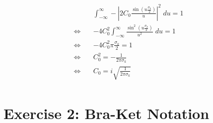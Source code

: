 \documentclass[a4paper,german,12pt,smallheadings]{scrartcl}
\begin{document}
\begin{enumerate}[a)]
    \begin{align*}
      &\int_{-\infty}^{\infty} -\left|2C_0 \frac{\sin\left(u \frac{\sigma_k}{2}\right)}{u}\right|^2 \; du = 1 \\
      \Leftrightarrow\quad&
      -4C_0^2 \int_{-\infty}^{\infty} \frac{\sin^2\left(u \frac{\sigma_k}{2}\right)}{u^2} \; du = 1 \\
      \Leftrightarrow\quad&
      -4C_0^2 \pi \frac{\sigma_k}{2} = 1 \\
      \Leftrightarrow\quad&
      C_0^2 = -\frac{1}{2\pi \sigma_k}  \\
      \Leftrightarrow\quad&
      C_0 = i \sqrt{\frac{1}{2 \pi \sigma_k}} \\
    \end{align*}



\end{enumerate}

\section*{Exercise 2: Bra-Ket Notation}
\end{document}
